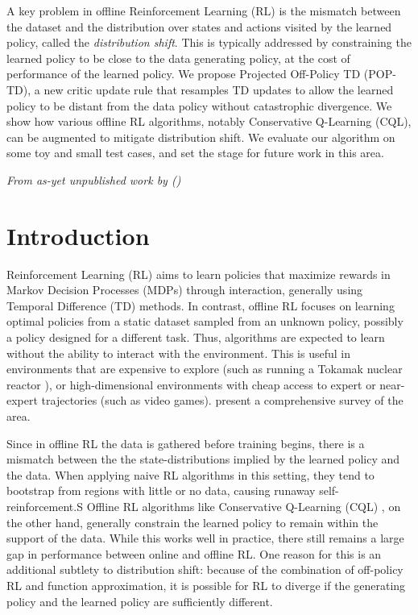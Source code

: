 

A key problem in offline Reinforcement Learning (RL) is the mismatch between the dataset and the distribution over states and actions visited by the learned policy, called the \emph{distribution shift}. This is typically addressed by constraining the learned policy to be close to the data generating policy, at the cost of performance of the learned policy. We propose Projected Off-Policy TD (POP-TD), a new critic update rule that resamples TD updates to allow the learned policy to be distant from the data policy without catastrophic divergence. We show how various offline RL algorithms, notably Conservative Q-Learning (CQL), can be augmented to mitigate distribution shift. We evaluate our algorithm on some toy and small test cases, and set the stage for future work in this area.

\emph{From as-yet unpublished work by \citeauthor{manek2023poptd} (\citeyear{manek2023poptd})}

\clearpage


\section{Introduction}

Reinforcement Learning (RL) aims to learn policies that maximize rewards in Markov Decision Processes (MDPs) through interaction, generally using Temporal Difference (TD) methods. In contrast, offline RL focuses on learning optimal policies from a static dataset sampled from an unknown policy, possibly a policy designed for a different task. Thus, algorithms are expected to learn without the ability to interact with the environment.
This is useful in environments that are expensive to explore (such as running a Tokamak nuclear reactor \cite{degrave2022magnetic}), or high-dimensional environments with cheap access to expert or near-expert trajectories (such as video games). \citet{levine2020survey} present a comprehensive survey of the area.

Since in offline RL the data is gathered before training begins, there is a mismatch between the the state-distributions implied by the learned policy and the data.
When applying naive RL algorithms in this setting, they tend to bootstrap from regions with little or no data, causing runaway self-reinforcement.S
Offline RL algorithms like Conservative Q-Learning (CQL) \cite{kumar2020cql}, on the other hand, generally constrain the learned policy to remain within the support of the data. While this works well in practice, there still remains a large gap in performance between online and offline RL. One reason for this is an additional subtlety to distribution shift: because of the combination of off-policy RL and function approximation, it is possible for RL to diverge if the generating policy and the learned policy are sufficiently different.

